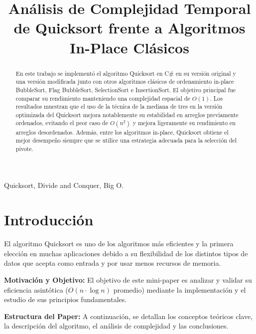 \documentclass[conference]{IEEEtran}
\begin{document}
\title{Análisis de Complejidad Temporal de Quicksort frente a Algoritmos In-Place Clásicos}

\author{
\and
{}
}

\maketitle

\begin{abstract}
En este trabajo se implementó el algoritmo Quicksort en C\# en su versión original y una versión modificada junto con otros algoritmos clásicos de ordenamiento in-place BubbleSort, Flag BubbleSort, SelectionSort e InsertionSort.
El objetivo principal fue comparar su rendimiento manteniendo una complejidad espacial de $O(1)$.
Los resultados muestran que  el uso de la técnica de la mediana de tres en la versión optimizada del Quicksort mejora notablemente su estabilidad en arreglos previamente ordenados, evitando el peor caso de $O(n^2)$ y mejora ligeramente su rendimiento en arreglos desordenados.
Además, entre los algoritmos in-place, Quicksort obtiene el mejor desempeño siempre que se utilice una estrategia adecuada para la selección del pivote.
\end{abstract}

\begin{IEEEkeywords}
Quicksort, Divide and Conquer, Big O.
\end{IEEEkeywords}


\section{Introducción}

El algoritmo Quicksort es uno de los algoritmos más eficientes y la 
primera elección en muchas aplicaciones debido a su flexibilidad de los distintos tipos de datos que acepta como entrada y por usar menos recursos de memoria.\par
\textbf{Motivación y Objetivo:} El objetivo de este mini-paper es analizar y validar su eficiencia asintótica ($O(n\cdot \log{n})$ promedio) mediante la implementación y el estudio de sus principios fundamentales.\par   
\textbf{Estructura del Paper:} A continuación, se detallan los conceptos teóricos clave, la descripción del algoritmo, el análisis de complejidad y las conclusiones.
\end{document}
